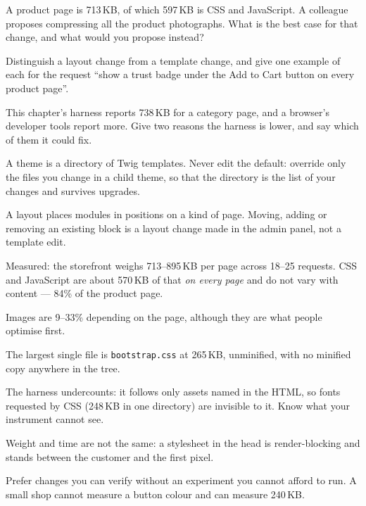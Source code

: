 \begin{checkpoint}
\begin{tightnum}
  \item A product page is 713\,KB, of which 597\,KB is CSS and JavaScript. A
        colleague proposes compressing all the product photographs. What is the
        best case for that change, and what would you propose instead?
  \item Distinguish a layout change from a template change, and give one
        example of each for the request ``show a trust badge under the Add to
        Cart button on every product page''.
  \item This chapter's harness reports 738\,KB for a category page, and a
        browser's developer tools report more. Give two reasons the harness is
        lower, and say which of them it could fix.
\end{tightnum}
\end{checkpoint}

\begin{chaptersummary}
\begin{tight}
  \item A theme is a directory of Twig templates. Never edit the default:
        override only the files you change in a child theme, so that the
        directory is the list of your changes and survives upgrades.
  \item A layout places modules in positions on a kind of page. Moving, adding
        or removing an existing block is a layout change made in the admin
        panel, not a template edit.
  \item Measured: the storefront weighs 713--895\,KB per page across 18--25
        requests. CSS and JavaScript are about 570\,KB of that \emph{on every
        page} and do not vary with content --- 84\% of the product page.
  \item Images are 9--33\% depending on the page, although they are what people
        optimise first.
  \item The largest single file is \texttt{bootstrap.css} at 265\,KB,
        unminified, with no minified copy anywhere in the tree.
  \item The harness undercounts: it follows only assets named in the HTML, so
        fonts requested by CSS (248\,KB in one directory) are invisible to it.
        Know what your instrument cannot see.
  \item Weight and time are not the same: a stylesheet in the head is
        render-blocking and stands between the customer and the first pixel.
  \item Prefer changes you can verify without an experiment you cannot afford
        to run. A small shop cannot measure a button colour and can measure
        240\,KB.
\end{tight}
\end{chaptersummary}


